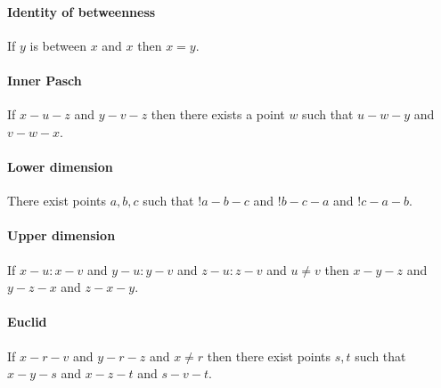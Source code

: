 \documentclass{article}
\begin{document}
  \paragraph{Identity of betweenness}

  \begin{forthel}
    \begin{axiom}[A6]
      If $y$ is between $x$ and $x$ then $x = y$.
    \end{axiom}
  \end{forthel}


  \paragraph{Inner Pasch}

  \begin{forthel}
    \begin{axiom}[A7]
      If $x-u-z$ and $y-v-z$ then there exists a point $w$ such that $u-w-y$ and $v-w-x$.
    \end{axiom}
  \end{forthel}


  \paragraph{Lower dimension}

  \begin{forthel}
    \begin{axiom}[A8]
      There exist points $a,b,c$ such that $!a-b-c$ and $!b-c-a$ and $!c-a-b$.
    \end{axiom}
  \end{forthel}


  \paragraph{Upper dimension}

  \begin{forthel}
    \begin{axiom}[A9]
      If $x-u : x-v$ and $y-u : y-v$ and $z-u : z-v$ and $u \neq v$ then $x-y-z$ and $y-z-x$ and $z-x-y$.
    \end{axiom}
  \end{forthel}


  \paragraph{Euclid}

  \begin{forthel}
    \begin{axiom}[A10]
      If $x-r-v$ and $y-r-z$ and $x \neq r$ then there exist points $s,t$ such that $x-y-s$ and $x-z-t$ and $s-v-t$.
    \end{axiom}
  \end{forthel}
\end{document}
